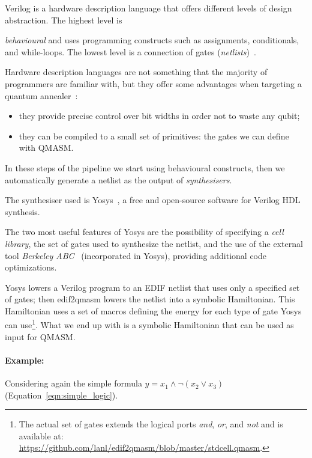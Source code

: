 Verilog is a hardware description language that offers different levels of design abstraction. The highest level is {\emph{behavioural} and uses programming constructs such as assignments, conditionals, and while-loops. The lowest level is a connection of gates (\emph{netlists})~\cite{gordon1995semantic}. 

Hardware description languages are not something that the majority of programmers are familiar with, but they offer some advantages when targeting a quantum annealer~\cite{pakin2019targeting}:
\begin{itemize}
	\item they provide precise control over bit widths in order not to waste any qubit;
	\item they can be compiled to a small set of primitives: the gates we can define with QMASM.
\end{itemize}

In these steps of the pipeline we start using behavioural constructs, then we automatically generate a netlist as the output of \emph{synthesisers}. 

The synthesiser used is Yosys~\cite{wolf2013yosys}, a free and open-source software for Verilog HDL synthesis.

The two most useful features of Yosys are the possibility of specifying a \emph{cell library}, the set of gates used to synthesize the netlist, and the use of the external tool\emph{ Berkeley ABC}~\cite{brayton2010abc} (incorporated in Yosys), providing additional code optimizations.

Yosys lowers a Verilog program to an EDIF netlist that uses only a specified set of gates; then edif2qmasm lowers the netlist into a symbolic Hamiltonian. This Hamiltonian uses a set of macros defining the energy for each type of gate Yosys can use\footnote{The actual set of gates extends the logical ports \emph{and}, \emph{or}, and \emph{not} and is available at: \url{https://github.com/lanl/edif2qmasm/blob/master/stdcell.qmasm}.}. What we end up with is a symbolic Hamiltonian that can be used as input for QMASM.

\paragraph{Example:}\label{ex:sat_verilog} Considering again the simple formula $y = x_1 \land \neg(x_2\lor x_3)$ (Equation~\ref{eqn:simple_logic}).

}
